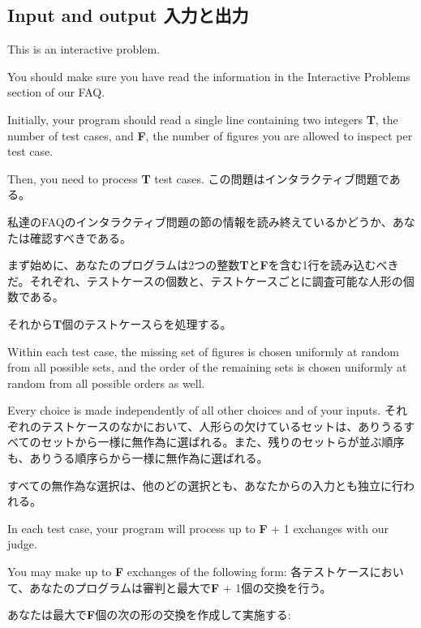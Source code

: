 \documentclass[uplatex,dvipdfmx]{jsarticle} \usepackage{amsmath,amssymb,bm}
\begin{document}
\subsection*{Input and output 入力と出力}
\begin{paracol}{2}
This is an interactive problem.

You should make sure you have read the information in the Interactive Problems section of our FAQ.

Initially, your program should read a single line containing two integers {\bf T}, the number of test cases, and {\bf F}, the number of figures you are allowed to inspect per test case.

Then, you need to process {\bf T} test cases.
\switchcolumn
この問題はインタラクティブ問題である。

私達のFAQのインタラクティブ問題の節の情報を読み終えているかどうか、あなたは確認すべきである。

まず始めに、あなたのプログラムは2つの整数{\bf T}と{\bf F}を含む1行を読み込むべきだ。それぞれ、テストケースの個数と、テストケースごとに調査可能な人形の個数である。

それから{\bf T}個のテストケースらを処理する。
\end{paracol}
\vspace{\baselineskip}
\begin{paracol}{2}
Within each test case, the missing set of figures is chosen uniformly at random from all possible sets, and the order of the remaining sets is chosen uniformly at random from all possible orders as well.

Every choice is made independently of all other choices and of your inputs.
\switchcolumn
それぞれのテストケースのなかにおいて、人形らの欠けているセットは、ありうるすべてのセットから一様に無作為に選ばれる。また、残りのセットらが並ぶ順序も、ありうる順序らから一様に無作為に選ばれる。

すべての無作為な選択は、他のどの選択とも、あなたからの入力とも独立に行われる。
\end{paracol}
\vspace{\baselineskip}
\begin{paracol}{2}
In each test case, your program will process up to {\bf F} + 1 exchanges with our judge.

You may make up to {\bf F} exchanges of the following form:
\switchcolumn
各テストケースにおいて、あなたのプログラムは審判と最大で{\bf F} + 1個の交換を行う。

あなたは最大で{\bf F}個の次の形の交換を作成して実施する:
\end{paracol}
\end{document}
